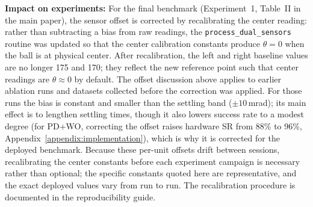 \textbf{Impact on experiments:}
For the final benchmark (Experiment~1, Table~II in the main paper),
the sensor offset is corrected by recalibrating the center reading:
rather than subtracting a bias from raw readings, the
\texttt{process\_dual\_sensors} routine was updated so that the
center calibration constants produce $\theta = 0$ when the ball is
at physical center.  After recalibration, the left and right baseline
values are no longer 175 and 170; they reflect the new reference point
such that center readings are $\theta \approx 0$ by default.
The offset discussion above applies to earlier ablation runs and
datasets collected before the correction was applied.  For those runs
the bias is constant and smaller than the settling band ($\pm 10$\,mrad);
its main effect is to lengthen settling times, though it also lowers
success rate to a modest degree (for PD+WO, correcting the offset raises
hardware SR from 88\% to 96\%, Appendix~\ref{appendix:implementation}),
which is why it is corrected for the deployed benchmark.
Because these per-unit offsets drift between sessions, recalibrating the
center constants before each experiment campaign is necessary rather than
optional; the specific constants quoted here are representative, and the
exact deployed values vary from run to run. The recalibration procedure
is documented in the reproducibility guide.
